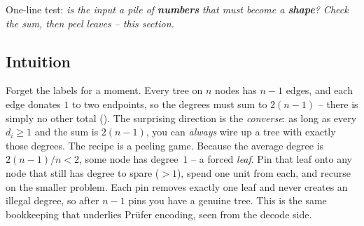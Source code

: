 \begin{recognitionbox}
One-line test: \emph{is the input a pile of \textbf{numbers} that must become a
\textbf{shape}? Check the sum, then peel leaves -- this section.}
\end{recognitionbox}

\subsection{Intuition}

Forget the labels for a moment. Every tree on $n$ nodes has $n-1$ edges, and each edge donates
$1$ to two endpoints, so the degrees must sum to $2(n-1)$ -- there is simply no other total
(). The surprising direction is the \emph{converse}: as long as every $d_i\ge1$
and the sum is $2(n-1)$, you can \emph{always} wire up a tree with exactly those degrees. The
recipe is a peeling game. Because the average degree is $2(n-1)/n<2$, some node has degree~$1$ --
a forced \emph{leaf}. Pin that leaf onto any node that still has degree to spare ($>1$), spend one
unit from each, and recurse on the smaller problem. Each pin removes exactly one leaf and never
creates an illegal degree, so after $n-1$ pins you have a genuine tree. This is the same bookkeeping
that underlies Pr\"ufer encoding, seen from the decode side.

